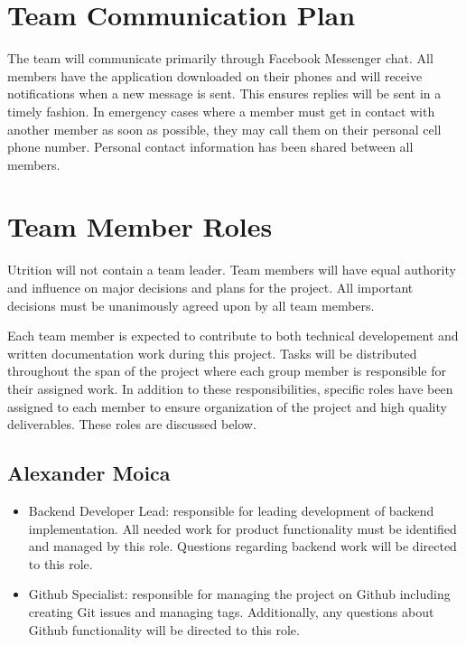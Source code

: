 \documentclass{article}
\begin{document}
\section{Team Communication Plan}

The team will communicate primarily through Facebook Messenger chat. All members have the application downloaded on their phones and will receive notifications when a new message is sent. This ensures replies will be sent in a timely fashion. In emergency cases where a member must get in contact with another member as soon as possible, they may call them on their personal cell phone number. Personal contact information has been shared between all members.

\section{Team Member Roles}

Utrition will not contain a team leader. Team members will have equal authority and influence on major decisions and plans for the project. All important decisions must be unanimously agreed upon by all team members.

Each team member is expected to contribute to both technical developement and written documentation work during this project. Tasks will be distributed throughout the span of the project where each group member is responsible for their assigned work. In addition to these responsibilities, specific roles have been assigned to each member to ensure organization of the project and high quality deliverables. These roles are discussed below. 

\subsection{Alexander Moica}

\begin{itemize}
	\item Backend Developer Lead: responsible for leading development of backend implementation. All needed work for product functionality must be identified and managed by this role. Questions regarding backend work will be directed to this role.
	\item Github Specialist: responsible for managing the project on Github including creating Git issues and managing tags. Additionally, any questions about Github functionality will be directed to this role.
\end{itemize}
\end{document}
